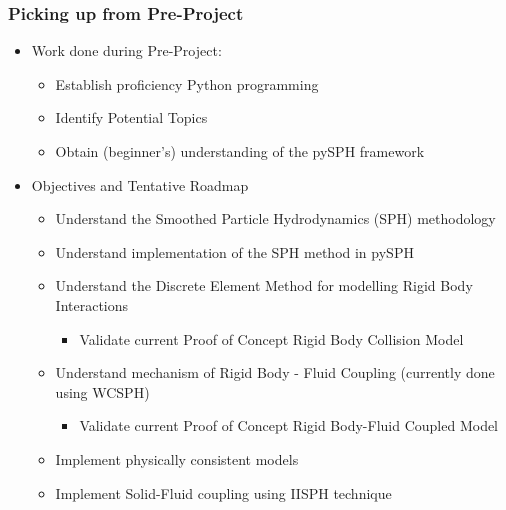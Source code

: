 \documentclass{beamer}
\begin{document}
 \begin{frame} %
  \frametitle{Picking up from Pre-Project}
  \begin{itemize}
   \item Work done during Pre-Project:
   \begin{itemize}
    \item Establish proficiency Python programming
    \item Identify Potential Topics
    \item Obtain (beginner's) understanding of the pySPH framework \pause 
   \end{itemize}
   \item Objectives and Tentative Roadmap \pause
    \begin{itemize}
     \item Understand the Smoothed Particle Hydrodynamics (SPH) methodology
     \item Understand implementation of the SPH method in pySPH \pause
     \item Understand the Discrete Element Method for modelling Rigid Body Interactions
     \begin{itemize}
     \item Validate current Proof of Concept Rigid Body Collision Model \pause
     \end{itemize} 
      \item Understand mechanism of Rigid Body - Fluid Coupling (currently done using WCSPH)
     \begin{itemize}
      \item Validate current Proof of Concept Rigid Body-Fluid Coupled Model \pause
     \end{itemize}
     \item Implement physically consistent models \pause
     \item Implement Solid-Fluid coupling using IISPH technique
    \end{itemize}
  \end{itemize}
 \end{frame}
 
\end{document}
